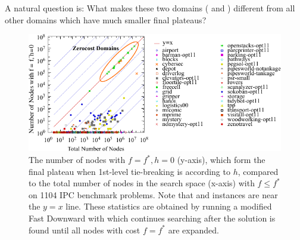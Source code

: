 A natural question is:  What makes these two domains
( and )  different from all other domains
which have much smaller final plateaus?

\begin{figure}[htbp]
   \centering
  \includegraphics[width=\linewidth]{tables/aaai16-frontier/aaai16prelim3/lmcut_frontier-front.pdf}
  \caption{
 The number of nodes with $f=f^*, h=0$ (y-axis), which form
  the final plateau when 1st-level tie-breaking is according to $h$, compared to
  the total number of nodes in the search space (x-axis) with $f\leq
  f^*$ on 1104 IPC benchmark problems.  Note that 
  and  instances are near the $y=x$ line.
  These statistics are obtained by running a modified Fast Downward with
 \lmcut which continues searching after the solution is found
 until all nodes with cost $f=f^*$ are expanded.} \label{fig:plateau}
\end{figure}

